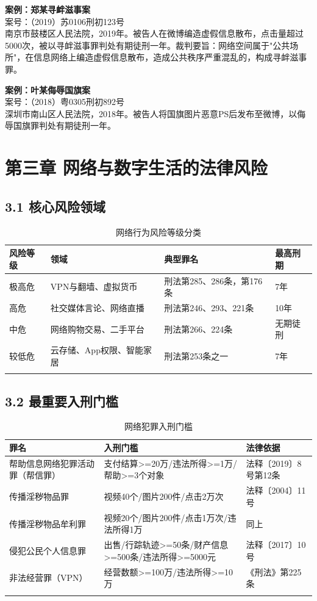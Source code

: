 \documentclass[12pt,a4paper]{article}
\begin{document}
\textbf{案例：郑某寻衅滋事案}\\
案号：（2019）苏0106刑初123号\\
南京市鼓楼区人民法院，2019年。被告人在微博编造虚假信息散布，点击量超过5000次，被以寻衅滋事罪判处有期徒刑一年。裁判要旨：网络空间属于"公共场所"，在信息网络上编造虚假信息散布，造成公共秩序严重混乱的，构成寻衅滋事罪。

\textbf{案例：叶某侮辱国旗案}\\
案号：（2018）粤0305刑初892号\\
深圳市南山区人民法院，2018年。被告人将国旗图片恶意PS后发布至微博，以侮辱国旗罪判处有期徒刑一年。

\clearpage

\section{第三章 网络与数字生活的法律风险}

\subsection{3.1 核心风险领域}

\begin{longtable}{p{2cm}p{4cm}p{4cm}p{2cm}}
  \toprule
  \textbf{风险等级} & \textbf{领域} & \textbf{典型罪名} & \textbf{最高刑期} \\
  \midrule
  极高危 & VPN与翻墙、虚拟货币 & 刑法第285、286条，第176条 & 7年 \\
  高危 & 社交媒体言论、网络直播 & 刑法第246、293、221条 & 10年 \\
  中危 & 网络购物交易、二手平台 & 刑法第266、224条 & 无期徒刑 \\
  较低危 & 云存储、App权限、智能家居 & 刑法第253条之一 & 7年 \\
  \bottomrule
  \caption{网络行为风险等级分类}
\end{longtable}

\subsection{3.2 最重要入刑门槛}

\begin{longtable}{p{4cm}p{4cm}p{4cm}}
  \toprule
  \textbf{罪名} & \textbf{入刑门槛} & \textbf{法律依据} \\
  \midrule
  帮助信息网络犯罪活动罪（帮信罪） & 支付结算>=20万/违法所得>=1万/帮助>=3个对象 & 法释〔2019〕8号第12条 \\
  传播淫秽物品罪 & 视频40个/图片200件/点击2万次 & 法释〔2004〕11号 \\
  传播淫秽物品牟利罪 & 视频20个/图片200件/点击1万次/违法所得1万 & 同上 \\
  侵犯公民个人信息罪 & 出售/行踪轨迹>=50条/财产信息>=500条/违法所得>=5000元 & 法释〔2017〕10号 \\
  非法经营罪（VPN） & 经营数额>=100万/违法所得>=10万 & 《刑法》第225条 \\
  \bottomrule
  \caption{网络犯罪入刑门槛}
\end{longtable}
\end{document}
